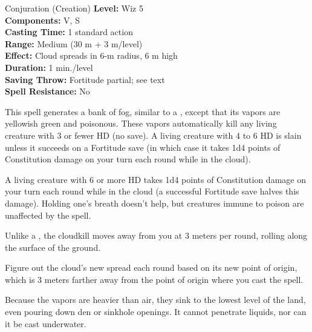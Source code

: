 {Conjuration (Creation)}
{
	\textbf{Level:}
	Wiz 5\\
	\textbf{Components:}
	V, S\\
	\textbf{Casting Time:}
	1 standard action\\
	\textbf{Range:}
	Medium (30 m + 3 m/level)\\
	\textbf{Effect:}
	Cloud spreads in 6-m radius, 6 m high\\
	\textbf{Duration:}
	1 min./level\\
	\textbf{Saving Throw:}
	Fortitude partial; see text\\
	\textbf{Spell Resistance:}
	No\\
}
{
	This spell generates a bank of fog, similar to a , except that its vapors are yellowish green and poisonous. These vapors automatically kill any living creature with 3 or fewer HD (no save). A living creature with 4 to 6 HD is slain unless it succeeds on a Fortitude save (in which case it takes 1d4 points of Constitution damage on your turn each round while in the cloud).

	A living creature with 6 or more HD takes 1d4 points of Constitution damage on your turn each round while in the cloud (a successful Fortitude save halves this damage). Holding one's breath doesn't help, but creatures immune to poison are unaffected by the spell.

	Unlike a , the cloudkill moves away from you at 3 meters per round, rolling along the surface of the ground.

	Figure out the cloud's new spread each round based on its new point of origin, which is 3 meters farther away from the point of origin where you cast the spell.

	Because the vapors are heavier than air, they sink to the lowest level of the land, even pouring down den or sinkhole openings. It cannot penetrate liquids, nor can it be cast underwater.

}
